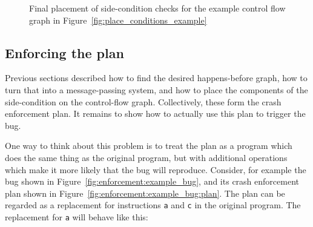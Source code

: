 \begin{figure}
  \caption{Final placement of side-condition checks for the example
    control flow graph in Figure~\ref{fig:place_conditions_example}}
  \label{fig:place_conditions_example:result}
\end{figure}


\subsection{Enforcing the plan}
\label{sect:enforce:interpreting}

Previous sections described how to find the desired happens-before
graph, how to turn that into a message-passing system, and how to
place the components of the side-condition on the control-flow graph.
Collectively, these form the crash enforcement plan.  It remains to
show how to actually use this plan to trigger the bug.

One way to think about this problem is to treat the plan as a program
which does the same thing as the original program, but with additional
operations which make it more likely that the bug will reproduce.
Consider, for example the bug shown in
Figure~\ref{fig:enforcement:example_bug}, and its crash enforcement
plan shown in Figure~\ref{fig:enforcement:example_bug:plan}.  The plan
can be regarded as a replacement for instructions {\tt a} and {\tt c}
in the original program.  The replacement for {\tt a} will behave like
this:

